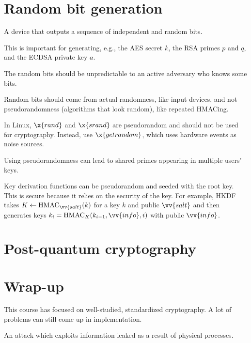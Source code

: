 \documentclass[class=co487,tikz,minted,notes]{agony}
\begin{document}

\chapter{Random bit generation}

\begin{defn}
  A device that outputs a sequence of independent and random bits.
\end{defn}

This is important for generating, e.g., the AES secret $k$,
the RSA primes $p$ and $q$, and the ECDSA private key $a$.

The random bits should be unpredictable to an active adversary who knows some bits.

Random bits should come from actual randomness, like input devices,
and not pseudorandomness (algorithms that look random), like repeated HMACing.

In Linux, $\x{rand}$ and $\x{srand}$ are pseudorandom and should not be used for cryptography.
Instead, use $\x{getrandom}$, which uses hardware events as noise sources.

Using pseudorandomness can lead to shared primes appearing in multiple users' keys.

Key derivation functions can be pseudorandom and seeded with the root key.
This is secure because it relies on the security of the key.
For example, HKDF takes $K \gets \text{HMAC}_{\vv{salt}}(k)$ for a key $k$ and public $\vv{salt}$
and then generates keys $k_i = \text{HMAC}_K(k_{i-1},\vv{info},i)$ with public $\vv{info}$.

\chapter{Post-quantum cryptography}

\chapter{Wrap-up}

This course has focused on well-studied, standardized cryptography.
A lot of problems can still come up in implementation.

\begin{defn}
  An attack which exploits information leaked as a result of physical processes.
\end{defn}
\end{document}
